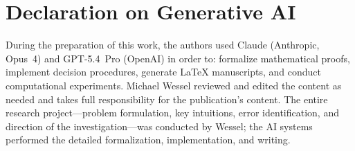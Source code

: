 \documentclass[
]{ceurart}
\theoremstyle{definition}
\begin{document}
\section*{Declaration on Generative AI}

During the preparation of this work, the authors used Claude (Anthropic,
Opus~4) and GPT-5.4~Pro (OpenAI) in order to: formalize mathematical
proofs, implement decision procedures, generate LaTeX manuscripts,
and conduct computational experiments.  Michael Wessel reviewed and
edited the content as needed and takes full responsibility for the
publication's content.  The entire research project---problem
formulation, key intuitions, error identification, and direction of
the investigation---was conducted by Wessel; the AI systems performed
the detailed formalization, implementation, and writing.
\end{document}
